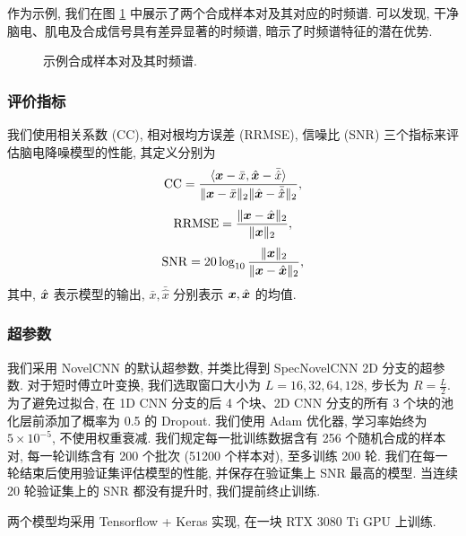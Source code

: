 \documentclass[12pt,a4paper]{article}
\begin{document}
作为示例, 我们在图 \ref{fig:sample} 中展示了两个合成样本对及其对应的时频谱. 可以发现, 干净脑电、肌电及合成信号具有差异显著的时频谱, 暗示了时频谱特征的潜在优势.

\begin{figure}
    \centering
    \caption{示例合成样本对及其时频谱.}\label{fig:sample}
\end{figure}

\subsubsection{评价指标}

我们使用相关系数 (CC), 相对根均方误差 (RRMSE), 信噪比 (SNR) 三个指标来评估脑电降噪模型的性能, 其定义分别为
\begin{equation}
    {\rm CC} = \frac{\langle {\bm{x}}-\bar{x}, \hat{{\bm{x}}}-\bar{\hat{x}} \rangle}{\|{\bm{x}}-\bar{x}\|_2 \|\hat{{\bm{x}}}-\bar{\hat{x}}\|_2},
\end{equation}
\begin{equation}
    {\rm RRMSE} = \frac{\|{\bm{x}}-\hat{{\bm{x}}}\|_2}{\|{\bm{x}}\|_2},
\end{equation}
\begin{equation}
    {\rm SNR} = 20 \log_{10} \frac{\|{\bm{x}}\|_2}{\|{\bm{x}}-\hat{{\bm{x}}}\|_2},
\end{equation}
其中, $\hat{{\bm{x}}}$ 表示模型的输出, $\bar{x}, \bar{\hat{x}}$ 分别表示 ${\bm{x}}, \hat{{\bm{x}}}$ 的均值.

\subsubsection{超参数}

我们采用 NovelCNN 的默认超参数, 并类比得到 SpecNovelCNN 2D 分支的超参数. 对于短时傅立叶变换, 我们选取窗口大小为 $L=16, 32, 64, 128$, 步长为 $R=\frac{L}{2}$. 为了避免过拟合, 在 1D CNN 分支的后 4 个块、2D CNN 分支的所有 3 个块的池化层前添加了概率为 0.5 的 Dropout. 我们使用 Adam 优化器, 学习率始终为 $5\times 10^{-5}$, 不使用权重衰减. 我们规定每一批训练数据含有 256 个随机合成的样本对, 每一轮训练含有 200 个批次 (51200 个样本对), 至多训练 200 轮. 我们在每一轮结束后使用验证集评估模型的性能, 并保存在验证集上 SNR 最高的模型. 当连续 20 轮验证集上的 SNR 都没有提升时, 我们提前终止训练.

两个模型均采用 Tensorflow + Keras 实现, 在一块 RTX 3080 Ti GPU 上训练.
\end{document}
